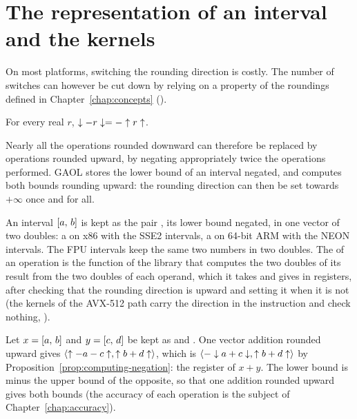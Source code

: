 \documentclass[12pt,a4paper,twoside,openright]{book}
\begin{document}
\section{The representation of an interval and the kernels}
\label{sec:kernels}
%
%

On most platforms, switching the rounding direction is costly. The number of
switches can however be cut down by relying on a property of the roundings
defined in Chapter~\ref{chap:concepts} ().

\begin{Prop}\label{prop:computing-negation}
For every real $r$, $\downarrow-r\downarrow = -\uparrow r\uparrow$.
\end{Prop}

Nearly all the operations rounded downward can therefore be replaced by
operations rounded upward, by negating appropriately twice the operations
performed. GAOL stores the lower bound of an interval negated, and computes
both bounds rounding upward: the rounding direction can then be set towards
$+\infty$ once and for all.

\begin{Def}\label{def:computing-register}
An interval $[a,\,b]$ is kept as the pair , its lower
bound negated, in one vector of two doubles: a  on x86 with
the SSE2 intervals, a  on 64-bit ARM with the NEON
intervals. The FPU intervals keep the same two numbers in two doubles. The
 of an operation is the function of the library that computes
the two doubles of its result from the two doubles of each operand, which it
takes and gives in registers, after checking that the rounding direction is
upward and setting it when it is not (the kernels of the AVX-512 path carry
the direction in the instruction and check nothing, ).
\end{Def}

\begin{Ex}
Let $x = [a,\,b]$ and $y = [c,\,d]$ be kept as  and
. One vector addition rounded upward gives
$\langle \uparrow-a-c\uparrow, \uparrow b+d\uparrow \rangle$, which is
$\langle -\downarrow a+c\downarrow, \uparrow b+d\uparrow \rangle$ by
Proposition~\ref{prop:computing-negation}: the register of $x+y$. The lower
bound is minus the upper bound of the opposite, so that one addition rounded
upward gives both bounds (the accuracy of each operation is the subject of
Chapter~\ref{chap:accuracy}).
\end{Ex}
\end{document}
